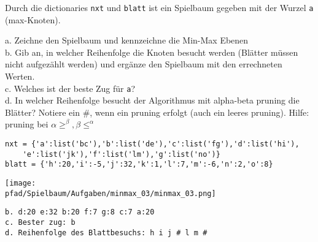 \question[6]
Durch die dictionaries \texttt{nxt} und \texttt{blatt} ist ein Spielbaum
 gegeben mit der Wurzel \texttt{a} (max-Knoten).

a. Zeichne den Spielbaum und kennzeichne die Min-Max Ebenen \\
b. Gib an, in welcher Reihenfolge die Knoten besucht werden (Blätter müssen nicht aufgezählt werden)
 und ergänze den Spielbaum mit den errechneten Werten. \\
c. Welches ist der beste Zug für \texttt{a}? \\
d. In welcher Reihenfolge besucht der Algorithmus mit alpha-beta pruning die Blätter? Notiere ein \#, wenn
ein pruning erfolgt (auch ein leeres pruning). Hilfe: pruning bei $\alpha \ge^{\beta},  \beta \le^{\alpha}$

\begin{lstlisting}
nxt = {'a':list('bc'),'b':list('de'),'c':list('fg'),'d':list('hi'),
    'e':list('jk'),'f':list('lm'),'g':list('no')}
blatt = {'h':20,'i':-5,'j':32,'k':1,'l':7,'m':-6,'n':2,'o':8}
\end{lstlisting}
\begin{solutionbox}{10cm}
\texttt{[image: \\pfad/Spielbaum/Aufgaben/minmax\_03/minmax\_03.png]}
\begin{lstlisting}
b. d:20 e:32 b:20 f:7 g:8 c:7 a:20
c. Bester zug: b
d. Reihenfolge des Blattbesuchs: h i j # l m #
\end{lstlisting}
\end{solutionbox}
